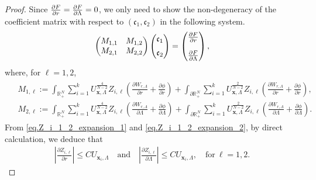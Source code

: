 \documentclass[10pt,a4paper]{amsart}
\begin{document}
\begin{proof}
Since $\frac{\partial F}{\partial r}= \frac{\partial F}{\partial \Lambda}=0 \vspace{5pt}$, we only need to show the non-degeneracy of the coefficient matrix with respect to $(\mathfrak c_1,\mathfrak c_2)$ in the following system.
  \begin{align*}
    \begin{pmatrix}
      M_{1,1} & M_{1,2}\\
      M_{2,1} & M_{2,2}
    \end{pmatrix}
    \begin{pmatrix}
    \mathfrak c_1 \vspace{5pt}\\ \mathfrak c_2
    \end{pmatrix} =
    \begin{pmatrix}
      \frac{\partial F}{\partial r} \vspace{10pt}\\
      \frac{\partial F}{\partial \Lambda}
    \end{pmatrix},
  \end{align*}
  where, for $\ell=1,2$,
  \begin{align*}
    \begin{aligned}
      &M_{1,\ell} := \int_{\mathbb{R}_{+}^{N}}\sum_{i=1}^{k} U_{\mathbf{x},\Lambda}^{\frac{4}{N-2}} Z_{i,\ell}\left(\frac{\partial W_{r,\Lambda}}{\partial r}+\frac{\partial \phi}{\partial r}\right)+\int_{\partial\mathbb{R}_{+}^{N}}\sum_{i=1}^{k} U_{\mathbf{x},\Lambda}^{\frac{2}{N-2}} Z_{i,\ell}\left(\frac{\partial W_{r,\Lambda}}{\partial r}+\frac{\partial \phi}{\partial r}\right),\\
      &M_{2,\ell} :=  \int_{\mathbb{R}_{+}^{N}}\sum_{i=1}^{k} U_{\mathbf{x},\Lambda}^{\frac{4}{N-2}} Z_{i,\ell}\left(\frac{\partial W_{r,\Lambda}}{\partial \Lambda}+\frac{\partial \phi}{\partial \Lambda}\right)+\int_{\partial\mathbb{R}_{+}^{N}}\sum_{i=1}^{k} U_{\mathbf{x},\Lambda}^{\frac{2}{N-2}} Z_{i,\ell}\left(\frac{\partial W_{r,\Lambda}}{\partial \Lambda}+\frac{\partial \phi}{\partial \Lambda}\right).
    \end{aligned}
  \end{align*}
  From \eqref{eq.Z_i_1_2_expansion_1} and \eqref{eq.Z_i_1_2_expansion_2}, by direct calculation,  we deduce that
  \begin{align*}
    \left|\frac{\partial Z_{i,\ell}}{\partial r}\right| \leq C U_{\mathbf{x}_{i},\Lambda} \quad\text{and}\quad \left|\frac{\partial Z_{i,\ell}}{\partial \Lambda}\right| \leq C U_{\mathbf{x}_{i},\Lambda}, \quad\text{for}~ \ell=1,2.

\end{align*}
\end{proof}
\end{document}

